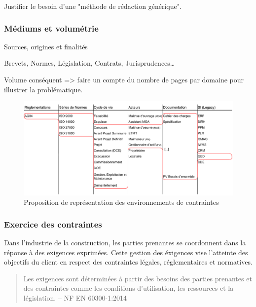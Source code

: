 \documentclass[a4paper,12pt]{article}
\begin{document}
Justifier le besoin d'une "méthode de rédaction générique".
\subsubsection{Médiums et volumétrie}
\label{sec:orgb7c024c}
Sources, origines et finalités

Brevets, Normes, Législation, Contrats, Jurisprudences\ldots{}

Volume conséquent => faire un compte du nombre de pages par domaine pour illustrer la problématique.

\begin{figure}[htbp]
\centering
\includegraphics[width=.9\linewidth]{./svg/360-view-engineering-environment.pdf}
\caption{\label{fig:orge259b30}Proposition de représentation des environnements de contraintes}
\end{figure}

\subsubsection{Exercice des contraintes}
\label{sec:orge6a9d95}
Dans l'industrie de la construction, les parties prenantes se coordonnent dans la réponse à des exigences exprimées. Cette gestion des éxigences vise l'atteinte des objectifs du client en respect des contraintes légales, réglementaires et normatives.

\begin{quote}
Les exigences sont déterminées à partir des besoins des parties prenantes et des contraintes comme les conditions d’utilisation, les ressources et la législation. -- NF EN 60300-1:2014\autocite{GestionSureteFonctionnement2014}
\end{quote}
\end{document}
